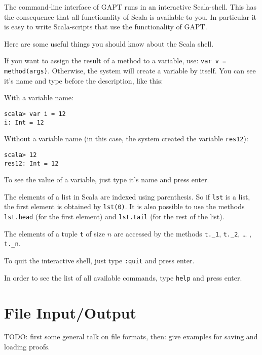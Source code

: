 \documentclass[a4paper,11pt]{article}
\newenvironment{meta}{\color{red}}{\color{black}}
\begin{document}
The command-line interface of GAPT runs in an interactive Scala-shell. This
has the consequence that all functionality of Scala is available to you. In
particular it is easy to write Scala-scripts that use the functionality of GAPT.

Here are some useful things you should know about the Scala shell.

If you want to assign the result of a method to a variable, use: 
\texttt{var v = method(args)}. Otherwise, the system will create a variable by 
itself. You can see it's name and type before the description, like this:

With a variable name:

\begin{lstlisting}
scala> var i = 12
i: Int = 12
\end{lstlisting}

Without a variable name (in this case, the system created the variable \texttt{res12}):

\begin{lstlisting}
scala> 12
res12: Int = 12
\end{lstlisting}

To see the value of a variable, just type it’s name and press enter.

The elements of a list in Scala are indexed using parenthesis. So if \texttt{lst} 
is a list, the first element is obtained by \texttt{lst(0)}. It is also possible 
to use the methods \texttt{lst.head} (for the first element) and \texttt{lst.tail} 
(for the rest of the list).

The elements of a tuple \texttt{t} of size $n$ are accessed by the methods 
\texttt{t.\_1}, \texttt{t.\_2}, … , \texttt{t.\_n}.

To quit the interactive shell, just type \texttt{:quit} and press enter.

In order to see the list of all available commands, type \texttt{help} and
press enter.

\section{File Input/Output}\label{sec.fileio}

\begin{meta}
TODO: first some general talk on file formats, then: give examples for saving and loading
proofs.
\end{meta}
\end{document}
